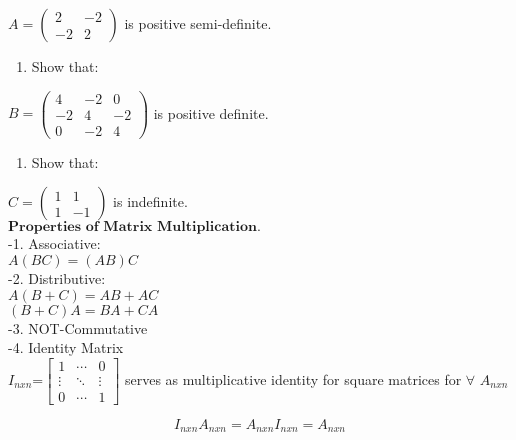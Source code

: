 \documentclass[]{article}
\providecommand{\tightlist}{%
  \setlength{\itemsep}{0pt}\setlength{\parskip}{0pt}}
\begin{document}
\(A=\begin{pmatrix} 2 & -2 \\ -2 & 2 \end{pmatrix}\) is positive
semi-definite.\\

\begin{enumerate}
\def\labelenumi{\alph{enumi})}
\setcounter{enumi}{1}
\tightlist
\item
  Show that:\\
\end{enumerate}

\(B=\begin{pmatrix} 4 & -2 & 0\\ -2 & 4 & -2 \\ 0 & -2 & 4\end{pmatrix}\)
is positive definite.\\

\begin{enumerate}
\def\labelenumi{\alph{enumi})}
\setcounter{enumi}{2}
\tightlist
\item
  Show that:\\
\end{enumerate}

\(C=\begin{pmatrix} 1 & 1 \\ 1 & -1 \end{pmatrix}\) is indefinite.\\

\(\textbf{Properties of Matrix Multiplication.}\)\\

-1. Associative:\\[2\baselineskip] \(A(BC)=(AB)C\)\\[2\baselineskip] -2.
Distributive:\\[2\baselineskip] \(A(B+C)=AB+AC\)\\[2\baselineskip]
\((B+C)A=BA+CA\)\\[2\baselineskip] -3. NOT-Commutative\\[2\baselineskip]
-4. Identity Matrix\\[2\baselineskip]
\(I_{nxn}\)=\(\begin{bmatrix} 1 & \cdots & 0 \\ \vdots & \ddots & \vdots \\ 0 & \cdots & 1 \end{bmatrix}\)
serves as multiplicative identity for square matrices for \(\forall\)
\(A_{nxn}\)

\[I_{nxn}A_{nxn}=A_{nxn}I_{nxn}=A_{nxn}\]\\
\end{document}
